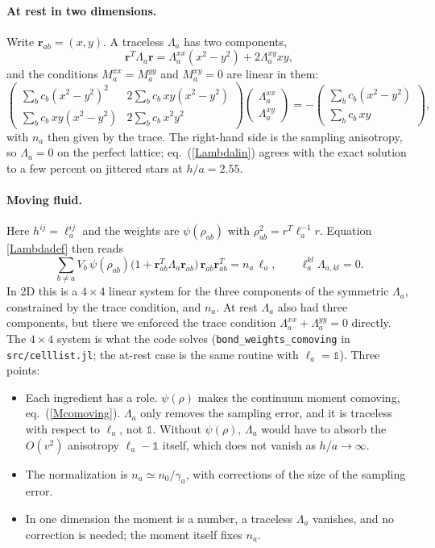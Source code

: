 \documentclass[11pt,aps,preprint,nofootinbib,superscriptaddress,tightenlines]{revtex4-2}
\def\st{\begin{equation}}
\def\stp{\end{equation}}
\def\Eq#1{eq.~(\ref{#1})}
\newcommand{\one}{\mathds{1}}
\let\oldparagraph\paragraph
\renewcommand{\paragraph}{\par\medskip\oldparagraph}
\begin{document}
\paragraph{At rest in two dimensions.}  Write $\bm r_{ab}=(x,y)$.  A traceless
$\Lambda_a$ has two components,
\st
\bm r^T\Lambda_a\bm r=\Lambda_a^{xx}(x^2-y^2)+2\Lambda_a^{xy}xy ,
\stp
and the conditions $M_a^{xx}=M_a^{yy}$ and $M_a^{xy}=0$ are linear in them:
\st
\begin{pmatrix}
\sum_bc_b(x^2-y^2)^2 & 2\sum_bc_b\,xy(x^2-y^2)\\[2pt]
\sum_bc_b\,xy(x^2-y^2) & 2\sum_bc_b\,x^2y^2
\end{pmatrix}
\begin{pmatrix}\Lambda_a^{xx}\\ \Lambda_a^{xy}\end{pmatrix}
=-\begin{pmatrix}\sum_bc_b(x^2-y^2)\\ \sum_bc_b\,xy\end{pmatrix},
\label{Lambdasolve}
\stp
with $n_a$ then given by the trace.  The right-hand side is the
sampling anisotropy, so $\Lambda_a=0$ on the perfect lattice; \Eq{Lambdalin} agrees
with the exact solution to a few percent on jittered stars at $h/a=2.55$.

\paragraph{Moving fluid.}  Here $h^{ij}=\ell_a^{ij}$ and the weights are
$\psi(\rho_{ab})$ with $\rho_{ab}^2=r^T\ell_a^{-1}r$.  Equation \eqref{Lambdadef}
then reads
\st
\sum_{b\neq a}V_b\,\psi(\rho_{ab})\big(1+\bm r_{ab}^T\Lambda_a\bm r_{ab}\big)\,\bm r_{ab}\bm r_{ab}^T=n_a\,\ell_a,
\qquad \ell_a^{kl}\Lambda_{a,kl}=0 .
\stp
In 2D this is a $4\times4$ linear system for the three components of the symmetric
$\Lambda_a$, constrained by the trace condition, and $n_a$.  At rest $\Lambda_a$ also had
three components, but there we enforced the trace condition
$\Lambda_a^{xx}+\Lambda_a^{yy}=0$ directly.  The $4\times4$ system is what the code solves
(\texttt{bond\_weights\_comoving} in \texttt{src/celllist.jl}; the at-rest case
is the same routine with $\ell_a=\one$).  Three points:
\begin{itemize}
\item Each ingredient has a role.  $\psi(\rho)$ makes the continuum moment
  comoving, \Eq{Mcomoving}.  $\Lambda_a$ only removes the sampling error, and it is
  traceless with respect to $\ell_a$, not $\one$.  Without $\psi(\rho)$, $\Lambda_a$ would
  have to absorb the $O(v^2)$ anisotropy $\ell_a-\one$ itself, which does not vanish
  as $h/a\to\infty$.
\item The normalization is $n_a\simeq n_0/\gamma_a$, with corrections of the size
  of the sampling error.
\item In one dimension the moment is a number, a traceless $\Lambda_a$ vanishes,
  and no correction is needed; the moment itself fixes $n_a$.
\end{itemize}
\end{document}
